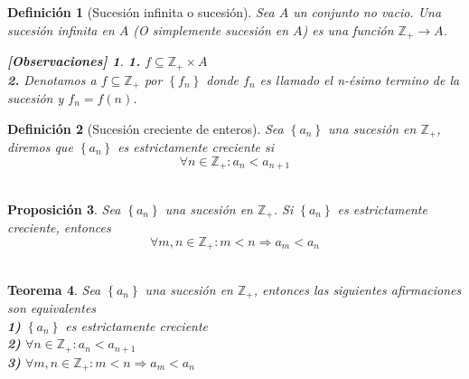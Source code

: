 \documentclass[oneside]{book} %
\theoremstyle{Teorema}
\newtheorem{Definicion}{Definición}[chapter]
\newtheorem{Teorema}[Definicion]{Teorema}
\newtheorem{Proposicion}[Definicion]{Proposición}
\theoremstyle{Ejemplos}
\theoremstyle{[Obs]}
\newtheorem*{Obs}{[Observaciones]}
\renewcommand{\{}{\left\lbrace} %
\renewcommand{\}}{\right\rbrace} %
\renewcommand{\sc}{\subseteq} %
\begin{document}
			\begin{Definicion}[Sucesión infinita o sucesión]
				
				Sea $A$ un conjunto no vacio. Una sucesión infinita en $A$ (O simplemente sucesión en $A$) es una función $\mathbb{Z}_{+} \to A$. \\

				\begin{Obs}
				
					\hfill
				
					\textbf{1.} $f \sc \mathbb{Z}_{+} \times A$ \\

					\textbf{2.} Denotamos a $f \sc \mathbb{Z}_{+}$ por $\{ f_n \}$ donde $f_n$ es llamado el n-ésimo termino de la sucesión y $f_n = f(n)$. \\
				
				\end{Obs}

			\end{Definicion}

			\begin{Definicion}[Sucesión creciente de enteros]
				
				Sea $\{ a_n \}$ una sucesión en $\mathbb{Z}_{+}$, diremos que $\{ a_n \}$ es estrictamente creciente si \\

				\[ \forall n \in \mathbb{Z}_{+} : a_n < a_{n + 1} \] \\

			\end{Definicion}

			\begin{Proposicion}
				
				Sea $\{ a_n \}$ una sucesión en $\mathbb{Z}_{+}$. Si $\{ a_n \}$ es estrictamente creciente, entonces \\

				\[ \forall m, n \in \mathbb{Z}_{+} : m < n \Rightarrow a_m < a_n \] \\

			\end{Proposicion}

			\begin{Teorema}
				
				Sea $\{ a_n \}$ una sucesión en $\mathbb{Z}_{+}$, entonces las siguientes afirmaciones son equivalentes \\

				\textbf{1)} $\{ a_n \}$ es estrictamente creciente \\

				\textbf{2)} $\forall n \in \mathbb{Z}_{+} : a_n < a_{n + 1}$ \\

				\textbf{3)} $\forall m, n \in \mathbb{Z}_{+} : m < n \Rightarrow a_m < a_{n}$ \\

			\end{Teorema}
\end{document}
